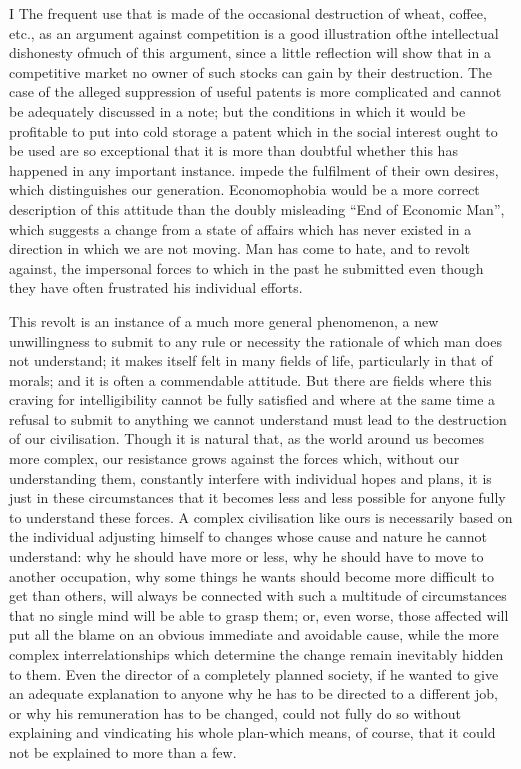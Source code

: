 \documentclass[11pt,openany]{book}
\begin{document}
I The frequent use that is made of the occasional destruction of wheat, coffee, etc., as an argument against competition is a good illustration ofthe intellectual dishonesty ofmuch of this argument, since a little reflection will show that in a competitive market no owner of such stocks can gain by their destruction. The case of the alleged suppression of useful patents is more complicated and cannot be adequately discussed in a note; but the conditions in which it would be profitable to put into cold storage a patent which in the social interest ought to be used are so exceptional that it is more than doubtful whether this has happened in any important instance. impede the fulfilment of their own desires, which distinguishes our generation. Economophobia would be a more correct description of this attitude than the doubly misleading ``End of Economic Man'', which suggests a change from a state of affairs which has never existed in a direction in which we are not moving. Man has come to hate, and to revolt against, the impersonal forces to which in the past he submitted even though they have often frustrated his individual efforts.

This revolt is an instance of a much more general phenomenon, a new unwillingness to submit to any rule or necessity the rationale of which man does not understand; it makes itself felt in many fields of life, particularly in that of morals; and it is often a commendable attitude. But there are fields where this craving for intelligibility cannot be fully satisfied and where at the same time a refusal to submit to anything we cannot understand must lead to the destruction of our civilisation. Though it is natural that, as the world around us becomes more complex, our resistance grows against the forces which, without our understanding them, constantly interfere with individual hopes and plans, it is just in these circumstances that it becomes less and less possible for anyone fully to understand these forces. A complex civilisation like ours is necessarily based on the individual adjusting himself to changes whose cause and nature he cannot understand: why he should have more or less, why he should have to move to another occupation, why some things he wants should become more difficult to get than others, will always be connected with such a multitude of circumstances that no single mind will be able to grasp them; or, even worse, those affected will put all the blame on an obvious immediate and avoidable cause, while the more complex interrelationships which determine the change remain inevitably hidden to them. Even the director of a completely planned society, if he wanted to give an adequate explanation to anyone why he has to be directed to a different job, or why his remuneration has to be changed, could not fully do so without explaining and vindicating his whole plan-which means, of course, that it could not be explained to more than a few.
\end{document}
